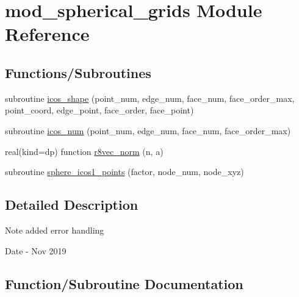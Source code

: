 \hypertarget{namespacemod__spherical__grids}{}\section{mod\+\_\+spherical\+\_\+grids Module Reference}
\label{namespacemod__spherical__grids}
\subsection*{Functions/\+Subroutines}
\begin{DoxyCompactItemize}
\item 
subroutine \hyperlink{namespacemod__spherical__grids_ac770a39945e60a262069f9f186819614}{icos\+\_\+shape} (point\+\_\+num, edge\+\_\+num, face\+\_\+num, face\+\_\+order\+\_\+max, point\+\_\+coord, edge\+\_\+point, face\+\_\+order, face\+\_\+point)
\item 
subroutine \hyperlink{namespacemod__spherical__grids_a98d8c41d6d666f6c3fe1dbadcf0dba89}{icos\+\_\+num} (point\+\_\+num, edge\+\_\+num, face\+\_\+num, face\+\_\+order\+\_\+max)
\item 
real(kind=dp) function \hyperlink{namespacemod__spherical__grids_adbe3eff686f6254a50a5afd75255c2c8}{r8vec\+\_\+norm} (n, a)
\item 
subroutine \hyperlink{namespacemod__spherical__grids_a58af853045eb54cbf3a8515e0f48b23b}{sphere\+\_\+icos1\+\_\+points} (factor, node\+\_\+num, node\+\_\+xyz)
\end{DoxyCompactItemize}


\subsection{Detailed Description}
\begin{DoxyNote}{Note}
added error handling 
\end{DoxyNote}
\begin{DoxyDate}{Date}
-\/ Nov 2019 
\end{DoxyDate}


\subsection{Function/\+Subroutine Documentation}
\mbox{\label{namespacemod__spherical__grids_a98d8c41d6d666f6c3fe1dbadcf0dba89}} 
